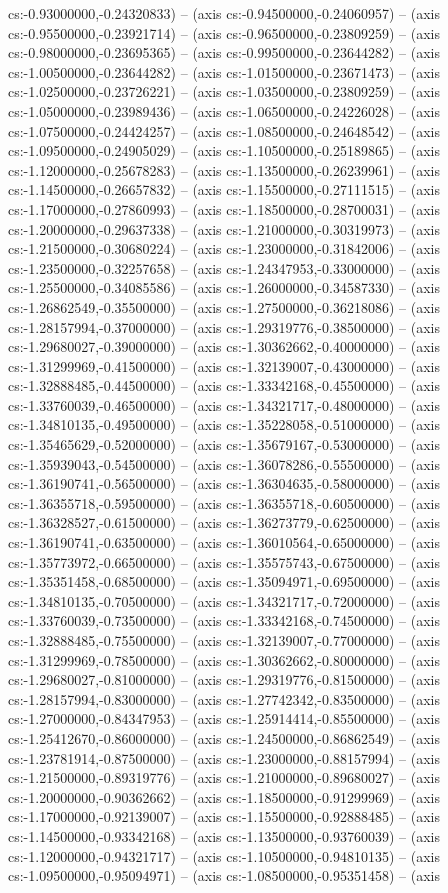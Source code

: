 cs:-0.93000000,-0.24320833) -- (axis cs:-0.94500000,-0.24060957) -- (axis cs:-0.95500000,-0.23921714) -- (axis cs:-0.96500000,-0.23809259) -- (axis cs:-0.98000000,-0.23695365) -- (axis cs:-0.99500000,-0.23644282) -- (axis cs:-1.00500000,-0.23644282) -- (axis cs:-1.01500000,-0.23671473) -- (axis cs:-1.02500000,-0.23726221) -- (axis cs:-1.03500000,-0.23809259) -- (axis cs:-1.05000000,-0.23989436) -- (axis cs:-1.06500000,-0.24226028) -- (axis cs:-1.07500000,-0.24424257) -- (axis cs:-1.08500000,-0.24648542) -- (axis cs:-1.09500000,-0.24905029) -- (axis cs:-1.10500000,-0.25189865) -- (axis cs:-1.12000000,-0.25678283) -- (axis cs:-1.13500000,-0.26239961) -- (axis cs:-1.14500000,-0.26657832) -- (axis cs:-1.15500000,-0.27111515) -- (axis cs:-1.17000000,-0.27860993) -- (axis cs:-1.18500000,-0.28700031) -- (axis cs:-1.20000000,-0.29637338) -- (axis cs:-1.21000000,-0.30319973) -- (axis cs:-1.21500000,-0.30680224) -- (axis cs:-1.23000000,-0.31842006) -- (axis cs:-1.23500000,-0.32257658) -- (axis cs:-1.24347953,-0.33000000) -- (axis cs:-1.25500000,-0.34085586) -- (axis cs:-1.26000000,-0.34587330) -- (axis cs:-1.26862549,-0.35500000) -- (axis cs:-1.27500000,-0.36218086) -- (axis cs:-1.28157994,-0.37000000) -- (axis cs:-1.29319776,-0.38500000) -- (axis cs:-1.29680027,-0.39000000) -- (axis cs:-1.30362662,-0.40000000) -- (axis cs:-1.31299969,-0.41500000) -- (axis cs:-1.32139007,-0.43000000) -- (axis cs:-1.32888485,-0.44500000) -- (axis cs:-1.33342168,-0.45500000) -- (axis cs:-1.33760039,-0.46500000) -- (axis cs:-1.34321717,-0.48000000) -- (axis cs:-1.34810135,-0.49500000) -- (axis cs:-1.35228058,-0.51000000) -- (axis cs:-1.35465629,-0.52000000) -- (axis cs:-1.35679167,-0.53000000) -- (axis cs:-1.35939043,-0.54500000) -- (axis cs:-1.36078286,-0.55500000) -- (axis cs:-1.36190741,-0.56500000) -- (axis cs:-1.36304635,-0.58000000) -- (axis cs:-1.36355718,-0.59500000) -- (axis cs:-1.36355718,-0.60500000) -- (axis cs:-1.36328527,-0.61500000) -- (axis cs:-1.36273779,-0.62500000) -- (axis cs:-1.36190741,-0.63500000) -- (axis cs:-1.36010564,-0.65000000) -- (axis cs:-1.35773972,-0.66500000) -- (axis cs:-1.35575743,-0.67500000) -- (axis cs:-1.35351458,-0.68500000) -- (axis cs:-1.35094971,-0.69500000) -- (axis cs:-1.34810135,-0.70500000) -- (axis cs:-1.34321717,-0.72000000) -- (axis cs:-1.33760039,-0.73500000) -- (axis cs:-1.33342168,-0.74500000) -- (axis cs:-1.32888485,-0.75500000) -- (axis cs:-1.32139007,-0.77000000) -- (axis cs:-1.31299969,-0.78500000) -- (axis cs:-1.30362662,-0.80000000) -- (axis cs:-1.29680027,-0.81000000) -- (axis cs:-1.29319776,-0.81500000) -- (axis cs:-1.28157994,-0.83000000) -- (axis cs:-1.27742342,-0.83500000) -- (axis cs:-1.27000000,-0.84347953) -- (axis cs:-1.25914414,-0.85500000) -- (axis cs:-1.25412670,-0.86000000) -- (axis cs:-1.24500000,-0.86862549) -- (axis cs:-1.23781914,-0.87500000) -- (axis cs:-1.23000000,-0.88157994) -- (axis cs:-1.21500000,-0.89319776) -- (axis cs:-1.21000000,-0.89680027) -- (axis cs:-1.20000000,-0.90362662) -- (axis cs:-1.18500000,-0.91299969) -- (axis cs:-1.17000000,-0.92139007) -- (axis cs:-1.15500000,-0.92888485) -- (axis cs:-1.14500000,-0.93342168) -- (axis cs:-1.13500000,-0.93760039) -- (axis cs:-1.12000000,-0.94321717) -- (axis cs:-1.10500000,-0.94810135) -- (axis cs:-1.09500000,-0.95094971) -- (axis cs:-1.08500000,-0.95351458) -- (axis 